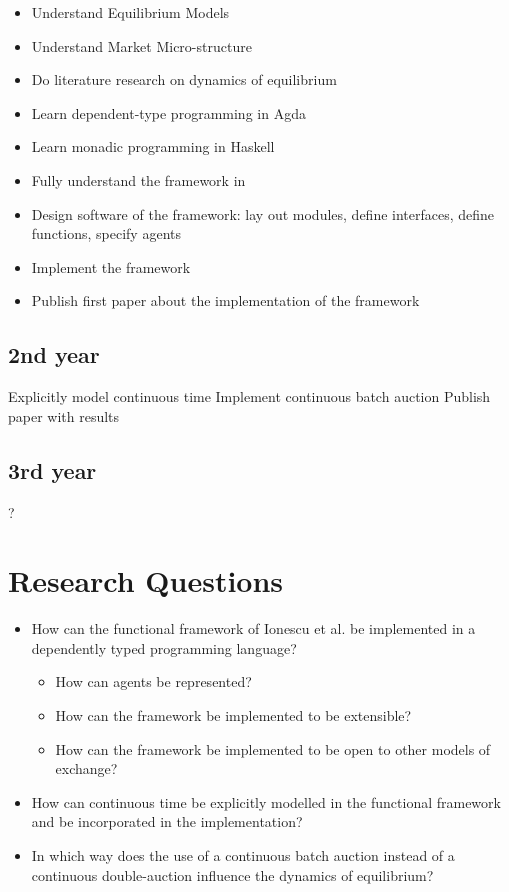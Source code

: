 \documentclass{article}
\begin{document}
\begin{itemize}
\item Understand Equilibrium Models
\item Understand Market Micro-structure
\item Do literature research on dynamics of equilibrium 
\item Learn dependent-type programming in Agda
\item Learn monadic programming in Haskell
\item Fully understand the framework in \cite{Botta20114025}
\item Design software of the framework: lay out modules, define interfaces, define functions, specify agents
\item Implement the framework
\item Publish first paper about the implementation of the framework
\end{itemize}

\subsection{2nd year}
Explicitly model continuous time
Implement continuous batch auction
Publish paper with results

\subsection{3rd year}
?


\section{Research Questions}
\begin{itemize}
\item How can the functional framework of Ionescu et al. be implemented in a dependently typed programming language?
	\begin{itemize}
	\item How can agents be represented?
	\item How can the framework be implemented to be extensible?
	\item How can the framework be implemented to be open to other models of exchange?
	\end{itemize}
\item How can continuous time be explicitly modelled in the functional framework and be incorporated in the implementation?
\item In which way does the use of a continuous batch auction instead of a continuous double-auction influence the dynamics of equilibrium?
\end{itemize}
\end{document}

